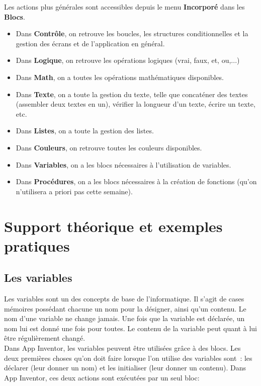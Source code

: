 \documentclass[12t,a4paper]{article}
\begin{document}
Les actions plus générales sont accessibles depuis le menu \textbf{Incorporé} dans les \textbf{Blocs}. 
\begin{itemize}
\item Dans \textbf{Contrôle}, on retrouve les boucles, les structures conditionnelles et la gestion des écrans et de l'application en général. 
\item Dans \textbf{Logique}, on retrouve les opérations logiques (vrai, faux, et, ou,...)
\item Dans \textbf{Math}, on a toutes les opérations mathématiques disponibles.
\item Dans \textbf{Texte}, on a toute la gestion du texte, telle que concaténer des textes (assembler deux textes en un), vérifier la longueur d'un texte, écrire un texte, etc.
\item Dans \textbf{Listes}, on a toute la gestion des listes.
\item Dans \textbf{Couleurs}, on retrouve toutes les couleurs disponibles.
\item Dans \textbf{Variables}, on a les blocs nécessaires à l'utilisation de variables.
\item Dans \textbf{Procédures}, on a les blocs nécessaires à la création de fonctions (qu'on n'utilisera a priori pas cette semaine).
\end{itemize}



\newpage

\section{Support théorique et exemples pratiques}
\subsection{Les variables}
Les variables sont un des concepts de base de l'informatique. Il s'agit de cases mémoires possédant chacune un nom pour la désigner, ainsi qu'un contenu. Le nom d'une variable ne change jamais. Une fois que la variable est déclarée, un nom lui est donné une fois pour toutes. Le contenu de la variable peut quant à lui être régulièrement changé.\\

Dans App Inventor, les variables peuvent être utilisées grâce à des blocs. Les deux premières choses qu'on doit faire lorsque l'on utilise des variables sont~: les déclarer (leur donner un nom) et les initialiser (leur donner un contenu). Dans App Inventor, ces deux actions sont exécutées par un seul bloc:
\end{document}
